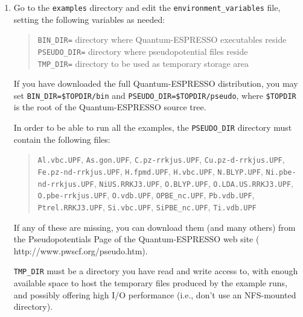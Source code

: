 \documentclass[12pt,a4paper]{article}
\begin{document}
\begin{enumerate}
  \item
Go to the \texttt{examples} directory and edit the
\texttt{environment\_variables} file, setting the following variables
as needed:
\begin{quote}
  \texttt{BIN\_DIR=} directory where Quantum-ESPRESSO executables reside\\
  \texttt{PSEUDO\_DIR=} directory where pseudopotential files reside\\
  \texttt{TMP\_DIR=} directory to be used as temporary storage area
\end{quote}
If you have downloaded the full Quantum-ESPRESSO distribution, you may set
\texttt{BIN\_DIR=\$TOPDIR/bin} and
\texttt{PSEUDO\_DIR=\$TOPDIR/pseudo}, where \texttt{\$TOPDIR} is the
root of the Quantum-ESPRESSO source tree.

In order to be able to run all the examples, the \texttt{PSEUDO\_DIR}
directory must contain the following files:    
\begin{quote}
  \begin{flushleft}
%
%
    \texttt{Al.vbc.UPF},
    \texttt{As.gon.UPF},
    \texttt{C.pz-rrkjus.UPF},
    \texttt{Cu.pz-d-rrkjus.UPF},
    \texttt{Fe.pz-nd-rrkjus.UPF},
    \texttt{H.fpmd.UPF},
    \texttt{H.vbc.UPF},
    \texttt{N.BLYP.UPF},
    \texttt{Ni.pbe-nd-rrkjus.UPF},
    \texttt{NiUS.RRKJ3.UPF},
    \texttt{O.BLYP.UPF},
    \texttt{O.LDA.US.RRKJ3.UPF},
    \texttt{O.pbe-rrkjus.UPF},
    \texttt{O.vdb.UPF},
    \texttt{OPBE\_nc.UPF},
    \texttt{Pb.vdb.UPF},
    \texttt{Ptrel.RRKJ3.UPF},
    \texttt{Si.vbc.UPF},
    \texttt{SiPBE\_nc.UPF},
    \texttt{Ti.vdb.UPF}
  \end{flushleft}
\end{quote}
%
If any of these are missing, you can download them (and many others) from the
Pseudopotentials Page of the Quantum-ESPRESSO web site
(%
                   {http://www.pwscf.org/pseudo.htm}).

\texttt{TMP\_DIR} must be a directory you have read and write access
to, with enough available space to host the temporary files produced
by the example runs, and possibly offering high I/O performance (i.e.,
don't use an NFS-mounted directory).


\end{enumerate}
\end{document}
